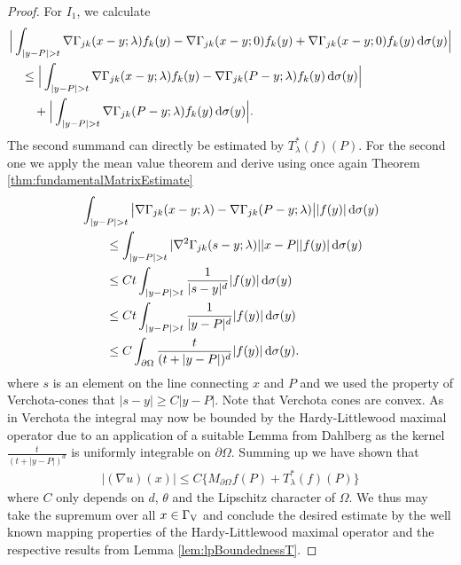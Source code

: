\begin{proof}
   For $I_1$, we calculate
   \begin{align*}
     &\Big| \int_{| y - P | > t} \nabla \Gamma_{j k} (x - y; \lambda) f_k(y) - \nabla \Gamma_{jk}(x - y; 0) f_k(y) + \nabla \Gamma_{jk}(x - y; 0) f_k(y) \, {\operatorname{d}\!{\sigma}}(y) \Big| \\
     &\quad\leq \Big| \int_{|y - P| > t} \nabla\Gamma_{jk}(x - y; \lambda) f_k(y) - \nabla\Gamma_{jk}(P - y; \lambda) f_k(y) \, {\operatorname{d}\!{\sigma}}(y) \Big| \\
     &\qquad+ \Big| \int_{|y - P| > t} \nabla\Gamma_{jk}(P - y; \lambda) f_k(y) \, {\operatorname{d}\!{\sigma}}(y) \Big|.
   \end{align*}
  The second summand can directly be estimated by $T_\lambda^*(f)(P)$.
  For the second one we apply the mean value theorem and derive using once again Theorem \ref{thm:fundamentalMatrixEstimate}
  \begin{align*}
    &\int_{|y - P| > t} \big| \nabla\Gamma_{jk}(x - y; \lambda) - \nabla\Gamma_{jk}(P - y; \lambda) \big| |f(y)| \, {\operatorname{d}\!{\sigma}}(y) \\ 
    &\qquad\leq \int_{|y - P| > t} |\nabla^2 \Gamma_{jk}(s - y; \lambda)| |x - P| |f(y) | \, {\operatorname{d}\!{\sigma}}(y) \\
    &\qquad\leq C t \int_{|y - P| > t} \frac{1}{|s - y|^{d}} |f(y)| \, {\operatorname{d}\!{\sigma}}(y) \\
    &\qquad\leq C t \int_{|y - P| > t} \frac{1}{|y - P|^{d}} |f(y)| \, {\operatorname{d}\!{\sigma}}(y) \\
    &\qquad\leq C \int_{\partial\Omega} \frac{t}{(t + |y - P|)^d} |f(y)| \, {\operatorname{d}\!{\sigma}}(y).
  \end{align*}
  where $s$ is an element on the line connecting $x$ and $P$ and we used the property of Verchota-cones that $|s - y| \geq C |y - P|$.
  Note that Verchota cones are convex.
  As in Verchota \cite{verchotaDiss} the integral may now be bounded by the Hardy-Littlewood maximal operator due to an application of a suitable Lemma from Dahlberg \cite{dahlberg} as the kernel $\frac{t}{(t + |y - P|)^d}$ is uniformly integrable on $\partial\Omega$.
  Summing up we have shown that
  \begin{align*}
    |(\nabla u)(x)| \leq C \big\{ M_{\partial\Omega} f(P) + T_\lambda^*(f)(P) \}
  \end{align*}
  where $C$ only depends on $d$, $\theta$ and the Lipschitz character of $\Omega$.
  We thus may take the supremum over all $x \in \Gamma_\mathrm{V}$ and conclude the desired estimate by the well known mapping properties of the Hardy-Littlewood maximal operator and the respective results from Lemma \ref{lem:lpBoundednessT}.

\end{proof}
